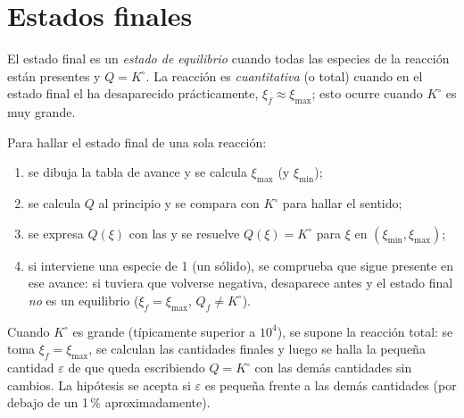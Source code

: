 \section{Estados finales}

\begin{definition}\label{def:b1:extent-q-and-k:quantitative}
El estado final es un \emph{estado de equilibrio}
cuando todas las especies de la reacción están presentes y $Q = K^\circ$.
La reacción es \emph{cuantitativa} (o total)
cuando en el estado final el  ha desaparecido
prácticamente, $\xi_f \approx \xi_{\max}$; esto ocurre cuando $K^\circ$
es muy grande.
\end{definition}

\begin{method}\label{met:b1:extent-q-and-k:final-state}
Para hallar el estado final de una sola reacción:
\begin{enumerate}
  \item se dibuja la tabla de avance y se calcula $\xi_{\max}$ (y
        $\xi_{\min}$);
  \item se calcula $Q$ al principio y se compara con $K^\circ$ para
        hallar el sentido;
  \item se expresa $Q(\xi)$ con las  y se resuelve
        $Q(\xi) = K^\circ$ para $\xi$ en $(\xi_{\min}, \xi_{\max})$;
  \item si interviene una especie de  1 (un sólido), se
        comprueba que sigue presente en ese avance: si tuviera que volverse
        negativa, desaparece antes y el estado final \emph{no} es un
        equilibrio ($\xi_f = \xi_{\max}$, $Q_f \ne K^\circ$).
\end{enumerate}
\end{method}

\begin{method}\label{met:b1:extent-q-and-k:quantitative}
Cuando $K^\circ$ es grande (típicamente superior a $10^4$), se supone la
reacción total: se toma $\xi_f = \xi_{\max}$, se calculan las cantidades
finales y luego se halla la pequeña cantidad $\varepsilon$ de  que queda escribiendo $Q =
K^\circ$ con las demás cantidades sin cambios. La hipótesis se acepta si
$\varepsilon$ es pequeña frente a las demás cantidades (por debajo de un
1\,\% aproximadamente).
\end{method}

